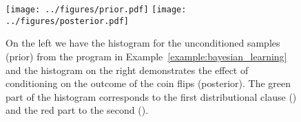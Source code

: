 \begin{figure}[h]
	\begin{center}
	\texttt{[image: ../figures/prior.pdf]}
	\texttt{[image: ../figures/posterior.pdf]}
	\end{center}
	\caption[Bayesian learning of coins]{On the left we have the histogram for the unconditioned samples (prior) from the program in Example~\ref{example:bayesian_learning} and the histogram on the right demonstrates the effect of conditioning on the outcome of the coin flips (posterior). The green part of the histogram corresponds to the first distributional clause () and the red part to the second ().}
	\label{fig:coins}
\end{figure}








